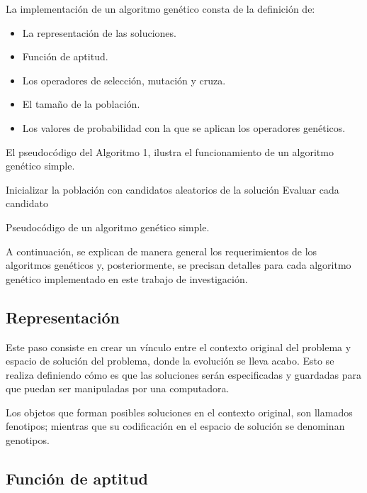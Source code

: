La implementación de un algoritmo genético consta de la definición de:

\begin{itemize}
	\item La representación de las soluciones.
	\item Función de aptitud.
	\item Los operadores de selección, mutación y cruza.
	\item El tamaño de la población.
	\item Los valores de probabilidad con la que se aplican los operadores genéticos.
\end{itemize}

El pseudocódigo del Algoritmo 1, ilustra el funcionamiento de un algoritmo genético simple.

\begin{algorithm}[h] 
	
	\SetAlgoLined
	Inicializar la población con candidatos aleatorios de la solución\;
	Evaluar cada candidato\;
	
	\caption{Pseudocódigo de un algoritmo genético simple.}
\end{algorithm}

A continuación, se explican de manera general los requerimientos de los algoritmos genéticos y, posteriormente, se precisan detalles para cada algoritmo genético implementado en este trabajo de investigación.

\subsection{Representación}

Este paso consiste en crear un vínculo entre el contexto original del problema y espacio de solución del problema, donde la evolución se lleva acabo. Esto se realiza definiendo cómo es que las soluciones serán especificadas y guardadas para que puedan ser manipuladas por una computadora.

Los objetos que forman posibles soluciones en el contexto original, son llamados fenotipos; mientras que su codificación en el espacio de solución se denominan genotipos.

\subsection{Función de aptitud}

